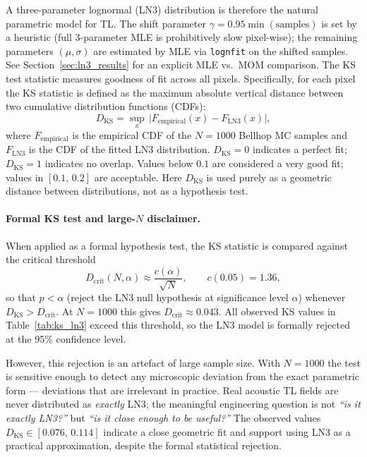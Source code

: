 \documentclass[11pt,a4paper]{article}
\begin{document}
A three-parameter lognormal (LN3) distribution is therefore the natural
parametric model for TL.
The shift parameter $\gamma = 0.95\min(\text{samples})$ is set by a heuristic
(full 3-parameter MLE is prohibitively slow pixel-wise); the remaining parameters
$(\mu, \sigma)$ are estimated by MLE via \texttt{lognfit} on the shifted samples.
See Section~\ref{sec:ln3_results} for an explicit MLE vs.\ MOM comparison.
The KS test statistic measures goodness of fit across all pixels.
Specifically, for each pixel the KS statistic is defined as the maximum absolute vertical
distance between two cumulative distribution functions (CDFs):
\begin{equation}
  D_{\mathrm{KS}} = \sup_{x}\,\bigl|F_{\mathrm{empirical}}(x) - F_{\mathrm{LN3}}(x)\bigr|,
\end{equation}
where $F_{\mathrm{empirical}}$ is the empirical CDF of the $N{=}1000$ Bellhop MC samples
and $F_{\mathrm{LN3}}$ is the CDF of the fitted LN3 distribution.
$D_{\mathrm{KS}} = 0$ indicates a perfect fit; $D_{\mathrm{KS}} = 1$ indicates no overlap.
Values below $0.1$ are considered a very good fit; values in $[0.1,\,0.2]$ are acceptable.
Here $D_{\mathrm{KS}}$ is used purely as a geometric distance between distributions,
not as a hypothesis test.

\paragraph{Formal KS test and large-$N$ disclaimer.}
When applied as a formal hypothesis test, the KS statistic is compared against the
critical threshold
\begin{equation}
  D_{\mathrm{crit}}(N,\alpha) \approx \frac{c(\alpha)}{\sqrt{N}},
  \qquad c(0.05) = 1.36,
\end{equation}
so that $p < \alpha$ (reject the LN3 null hypothesis at significance level $\alpha$)
whenever $D_{\mathrm{KS}} > D_{\mathrm{crit}}$.
At $N = 1000$ this gives $D_{\mathrm{crit}} \approx 0.043$.
All observed KS values in Table~\ref{tab:ks_ln3} exceed this threshold,
so the LN3 model is formally rejected at the 95\% confidence level.

However, this rejection is an artefact of large sample size.
With $N = 1000$ the test is sensitive enough to detect any microscopic deviation
from the exact parametric form --- deviations that are irrelevant in practice.
Real acoustic TL fields are never distributed as \emph{exactly} LN3;
the meaningful engineering question is not \emph{``is it exactly LN3?''} but
\emph{``is it close enough to be useful?''}
The observed values $D_{\mathrm{KS}} \in [0.076,\,0.114]$ indicate a close
geometric fit and support using LN3 as a practical approximation,
despite the formal statistical rejection.
\end{document}
